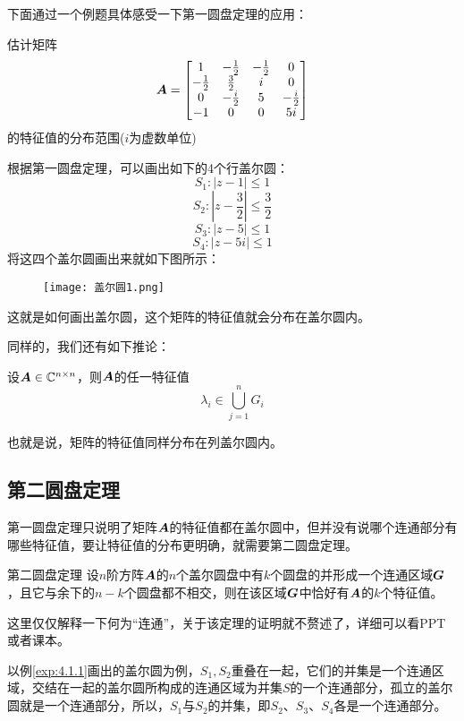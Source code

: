 \documentclass[12pt, a4paper, oneside, UTF8]{ctexbook}
\begin{document}
下面通过一个例题具体感受一下第一圆盘定理的应用：
\begin{example}\label{exp:4.1.1}
    估计矩阵\[\boldsymbol{A}=\begin{bmatrix}
        1&-\frac{1}{2}&-\frac{1}{2}&0\\
        -\frac{1}{2}&\frac{3}{2}&i&0\\
        0&-\frac{i}{2}&5&-\frac{i}{2}\\
        -1&0&0&5i
    \end{bmatrix}\]的特征值的分布范围($i$为虚数单位)
\end{example}

\begin{solution}
    根据第一圆盘定理，可以画出如下的4个行盖尔圆：
    \[S_1:|z-1|\leq 1\]
    \[S_2:|z-\frac{3}{2}|\leq \frac{3}{2}\]
    \[S_3:|z-5|\leq1\]
    \[S_4:|z-5i|\leq1\]
    将这四个盖尔圆画出来就如下图所示：
    \begin{figure}[h]
        \centering
        \texttt{[image: 盖尔圆1.png]}
    \end{figure}

    这就是如何画出盖尔圆，这个矩阵的特征值就会分布在盖尔圆内。
\end{solution}

同样的，我们还有如下推论：
\begin{corollary}{}{}
    设$\boldsymbol{A}\in\mathbb{C}^{n\times n}$，则$\boldsymbol{A}$的任一特征值\[\lambda_i\in\bigcup_{j=1}^{n}G_i\]
\end{corollary}

也就是说，矩阵的特征值同样分布在列盖尔圆内。

\subsection{第二圆盘定理}
第一圆盘定理只说明了矩阵$\boldsymbol{A}$的特征值都在盖尔圆中，但并没有说哪个连通部分有哪些特征值，要让特征值的分布更明确，就需要第二圆盘定理。
\begin{them}{第二圆盘定理}{}
    设$n$阶方阵$\boldsymbol{A}$的$n$个盖尔圆盘中有$k$个圆盘的并形成一个连通区域$\boldsymbol{G}$，且它与余下的$n-k$个圆盘都不相交，则在该区域$\boldsymbol{G}$中恰好有$\boldsymbol{A}$的$k$个特征值。
\end{them}

这里仅仅解释一下何为“连通”，关于该定理的证明就不赘述了，详细可以看PPT或者课本。

以例\ref{exp:4.1.1}画出的盖尔圆为例，$S_1, S_2$重叠在一起，它们的并集是一个连通区域，交结在一起的盖尔圆所构成的连通区域为并集$S$的一个连通部分，孤立的盖尔圆就是一个连通部分，所以，$S_1$与$S_2$的并集，即$S_2$、$S_3\text{、}S_4$各是一个连通部分。
\end{document}
